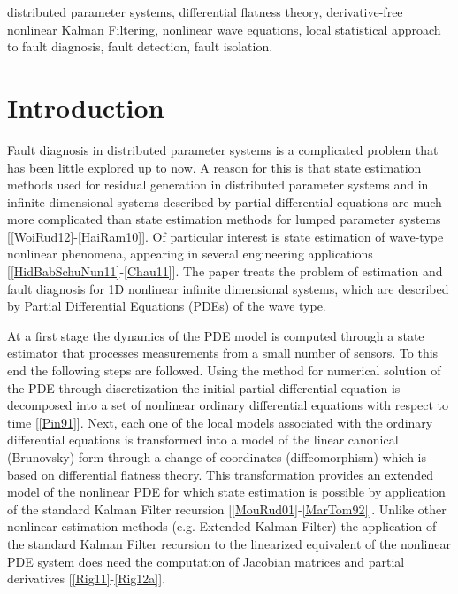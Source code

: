 \documentclass[journal]{IEEEtran}
\begin{document}
\begin{IEEEkeywords}
distributed parameter systems, differential flatness theory, derivative-free nonlinear Kalman Filtering, nonlinear wave equations, local statistical approach to fault diagnosis, fault detection, fault isolation.
\end{IEEEkeywords}






\IEEEpeerreviewmaketitle

\section{Introduction} \label{section 1: Introduction}

\noindent Fault diagnosis in distributed parameter systems is a complicated problem that has been little explored up to now. A reason for this is that state estimation methods used for residual generation in distributed parameter systems and in infinite dimensional systems described by partial differential equations are much more complicated than state estimation methods for lumped parameter systems [\ref{WoiRud12}-\ref{HaiRam10}]. Of particular interest is state estimation of wave-type nonlinear phenomena, appearing in several engineering applications [\ref{HidBabSchuNun11}-\ref{Chau11}]. The paper treats the problem of estimation and fault diagnosis for 1D nonlinear infinite dimensional systems, which are described by Partial Differential Equations (PDEs) of the wave type.

\noindent At a first stage the dynamics of the PDE model is computed through a state estimator that processes measurements from a small number of sensors. To this end the following steps are followed. Using the method for numerical solution of the PDE through discretization the initial partial differential equation is decomposed into a set of nonlinear ordinary differential equations with respect to time [\ref{Pin91}]. Next, each one of the local models associated with the ordinary differential equations is transformed into a model of the linear canonical (Brunovsky) form through a change of coordinates (diffeomorphism) which is based on differential flatness theory. This transformation provides an extended model of the nonlinear PDE for which state estimation is possible by application of the standard Kalman Filter recursion [\ref{MouRud01}-\ref{MarTom92}]. Unlike other nonlinear estimation methods (e.g. Extended Kalman Filter) the application of the standard Kalman Filter recursion to the linearized equivalent of the nonlinear PDE system does need the computation of Jacobian matrices and partial derivatives [\ref{Rig11}-\ref{Rig12a}].
\end{document}
